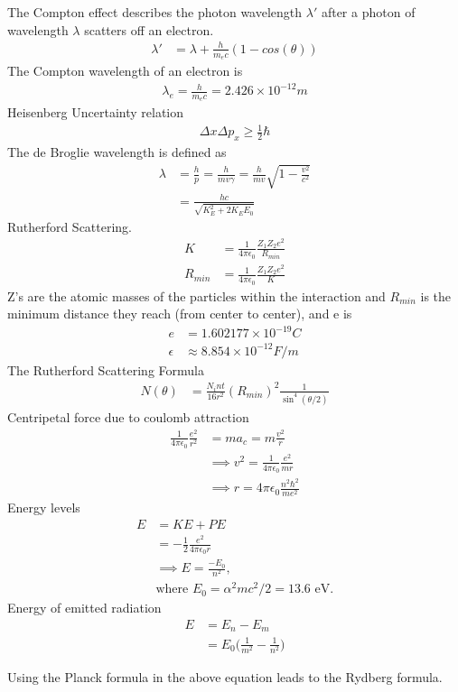\begin{multicols}{2}
The Compton effect describes the photon wavelength $\lambda'$ after a photon of wavelength $\lambda$ scatters off an electron.
\begin{align}
\lambda' &= \lambda + \frac{h}{m_ec}(1-cos(\theta)) 
\end{align}
The Compton wavelength of an electron is 
\begin{align}
\lambda_e = \frac{h}{m_ec}= 2.426 \times 10^{-12}m
\end{align}
Heisenberg Uncertainty relation
\begin{align}
	\Delta x \Delta p_x \geq \frac{1}{2}\hbar
\end{align}
The de Broglie wavelength is defined as
\begin{align}
\lambda &= \frac{h}{p} = \frac{h}{mv\gamma} = \frac{h}{mv}\sqrt{1-\frac{v^2}{c^2}} \\ &= \frac{hc}{\sqrt{K_E^2 + 2K_EE_0}}
\end{align}
Rutherford Scattering.
\begin{align}
K &=\frac{1}{4\pi \epsilon_0}\frac{Z_1Z_2e^2}{R_{min}} \\ R_{min} &=\frac{1}{4\pi \epsilon_0}\frac{Z_1Z_2e^2}{K}
\end{align}
Z's are the atomic masses of the particles within the interaction and $R_{min}$ is the minimum distance they reach (from center to center), and e is 
\begin{align}
e &=1.602177\times 10^{-19} C \\
\epsilon &\approx 8.854 \times 10^{-12} F/m
\end{align}
The Rutherford Scattering Formula
\begin{align}
N(\theta) &= \frac{N_int}{16r^2}(R_{min})^2\frac{1}{\sin^4(\theta/2)}
\end{align}
Centripetal force due to coulomb attraction
\begin{align}
\frac{1}{4\pi \epsilon_0} \frac{e^2}{r^2} &=ma_c=m\frac{v^2}{r}\\ &\implies v^2=\frac{1}{4\pi \epsilon_0}\frac{e^2}{mr} \\
&\implies r = 4\pi\epsilon_0\frac{n^2\hbar^2}{me^2}
\end{align}
Energy levels 
\begin{align}
E&=KE+PE \\&= -\frac{1}{2}\frac{e^2}{4\pi \epsilon_0r}\\ &\implies E =\frac{-E_0}{n^2}, \\
&\textrm{where $E_0=\alpha^2mc^2/2 = 13.6$ eV.}
\end{align}
Energy of emitted radiation
\begin{align}
E&=E_n-E_m \\ &= E_0\bigg(\frac{1}{m^2}-\frac{1}{n^2}\bigg)
\end{align}
\begin{note}
	Using the Planck formula in the above equation leads to the Rydberg formula.
\end{note}


\end{multicols}
